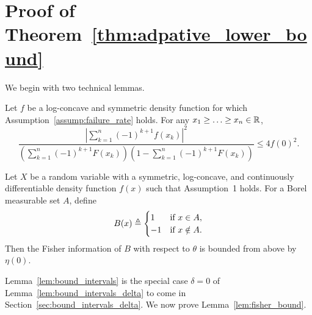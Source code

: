 \section{Proof of Theorem~\ref{thm:adpative_lower_bound}}
\label{proof:thm:adpative_lower_bound}

We begin with two technical lemmas.
\begin{lem} \label{lem:bound_intervals}
  Let $f$ be a log-concave and symmetric density function
  for which Assumption~\ref{assump:failure_rate} holds. For any $x_1 \geq
  \ldots \geq x_n \in \mathbb{R}$,
  \begin{equation}
    \frac{ \left| \sum_{k=1}^n (-1)^{k+1} f(x_k) \right|^2 }{
      \left( \sum_{k=1}^n (-1)^{k+1} F(x_k) \right) \left(1- \sum_{k=1}^n (-1)^{k+1} F(x_k) \right) } 
    \leq  4f(0)^2.
    \label{eq:lem_bound_intervals}
  \end{equation}
\end{lem}
\begin{lem} \label{lem:fisher_bound}
  Let $X$ be a random variable with a symmetric, log-concave, and
  continuously differentiable density function $f(x)$ such that Assumption~1
  holds. For a Borel measurable set $A$, define
  \begin{equation*}
    B(x) \triangleq \begin{cases} 1
      & \mbox{if} ~x \in A, \\
      -1 & \mbox{if}~ x \notin A.
    \end{cases}
  \end{equation*}
  Then the Fisher information of $B$ with respect to $\theta$ is bounded
  from above by $\eta(0)$.
\end{lem}

Lemma~\ref{lem:bound_intervals} is the special case $\delta = 0$ of
Lemma~\ref{lem:bound_intervals_delta} to come in
Section~\ref{sec:bound_intervals_delta}.  We now prove
Lemma~\ref{lem:fisher_bound}.

